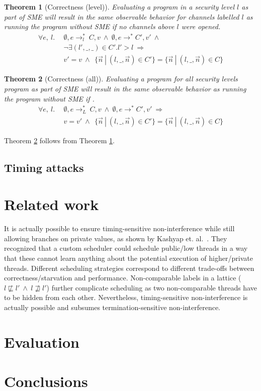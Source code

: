 \documentclass[10pt,preprint]{sigplanconf}
\newtheorem{theorem}{Theorem}
\begin{document}
\begin{theorem}[Correctness (level)]
  Evaluating a program in a security level $l$ as part of SME will result in the same observable behavior for channels labelled $l$ as running the program without SME if no channels above $l$ were opened.
\begin{align*}
\forall e,~ l.~~&\emptyset, e \rightarrow^{*}_l~C,v ~\wedge~\emptyset,e \rightarrow^{*} C',v'~\wedge  \\
                & \neg \exists {(l',\_,\_) \in C'} . l' > l ~\Rightarrow \\ & v' = v~\wedge~ ~\{ \vec{n} ~|~ (l, \_, \vec{n}) \in C' \} = \{ \vec{n} ~|~ (l, \_, \vec{n}) \in C \}
\end{align*}
\label{th:lvl}
\end{theorem}

\begin{theorem}[Correctness (all)]
  Evaluating a program for all security levels program as part of SME will result in the same observable behavior as running the program without SME if .
\begin{align*}
\forall e,~ l.~~&\emptyset, e \rightarrow^{*}_L~C,v ~\wedge~\emptyset,e \rightarrow^{*} C',v' ~\Rightarrow \\ & v = v'~\wedge~ ~\{ \vec{n} ~|~ (l, \_, \vec{n}) \in C' \} = \{ \vec{n} ~|~ (l, \_, \vec{n}) \in C \}
\end{align*}
\label{th:all}
\end{theorem}

Theorem \ref{th:all} follows from Theorem \ref{th:lvl}.

\subsection{Timing attacks}



\section{Related work}

It is actually possible to ensure timing-sensitive non-interference while still allowing branches on private values, as shown by Kashyap et. al.~\cite{kashyap2011}.  They recognized that a custom scheduler could schedule public/low threads in a way that these cannot learn anything about the potential execution of higher/private threads.  Different scheduling strategies correspond to different trade-offs between correctness/starvation and performance.  Non-comparable labels in a lattice ($l \not \sqsubseteq l'~\wedge~l \not \sqsupseteq l'$) further complicate scheduling as two non-comparable threads have to be hidden from each other.  Nevertheless, timing-sensitive non-interference is actually possible and subsumes termination-sensitive non-interference.

\section{Evaluation}



\section{Conclusions}




\end{document}
